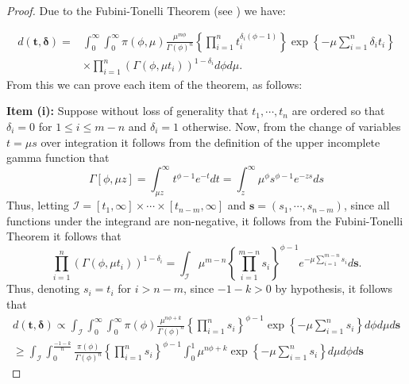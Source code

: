 \begin{proof} Due to the Fubini-Tonelli Theorem (see \cite{folland}) we have:

\begin{align*}%
d(\boldsymbol{t,\delta})=&\int_{0}^{\infty}\int_{0}^{\infty}\pi(\phi,\mu)\frac{\mu^{m\phi}}{\Gamma(\phi)^n}\left\{\prod_{i=1}^n{t_i^{\delta_i(\phi-1)}}\right\}\exp\left\{-\mu\sum_{i=1}^n {\delta_i}t_i\right\}\nonumber \\
&\times \prod_{i=1}^n\left(\Gamma(\phi,\mu t_i)\right)^{1-\delta_i}d\phi d\mu.
\end{align*}
From this we can prove each item of the theorem, as follows:

\vspace{0.3cm}
\noindent \textbf{Item (i):} Suppose without loss of generality that $t_1,\cdots,t_n$ are ordered so that $\delta_i=0$ for $1\leq i\leq m-n$ and $\delta_i=1$ otherwise. Now, from the change of variables $t=\mu s$ over integration it follows from the definition of the upper incomplete gamma function that
\begin{equation*}\Gamma[\phi,\mu z] =\int_{\mu z}^\infty t^{\phi-1} e^{-t}  dt =  \int_z^\infty \mu^\phi s^{\phi-1} e^{-zs} ds
\end{equation*}
Thus, letting $\mathcal{I}=[t_1,\infty]\times \cdots \times [t_{n-m},\infty]$ and $\boldsymbol{s} = (s_1,\cdots,s_{n-m})$, since all functions under the integrand are non-negative, it follows from the Fubini-Tonelli Theorem it follows that
\begin{equation*} \prod_{i=1}^n\left(\Gamma(\phi,\mu t_i)\right)^{1-\delta_i} = \int_{\mathcal{I}} \mu^{m-n} \left\{\prod_{i=1}^{m-n} s_i \right\}^{\phi-1}e^{-\mu \sum_{i=1}^{m-n} s_i}d\boldsymbol{s}.
\end{equation*}
Thus, denoting $s_i = t_i$ for $i>n-m$, since $-1-k>0$ by hypothesis, it follows that 
 \begin{equation}
 \begin{aligned}
 \label{posteriord2}
d(\boldsymbol{t,\delta})\propto \int_{\mathcal{I}} \int_{0}^{\infty}\int_{0}^{\infty}\pi(\phi)\frac{\mu^{n\phi+k}}{\Gamma(\phi)^n}\left\{\prod_{i=1}^n{s_i}\right\}^{\phi-1}\exp\left\{-\mu\sum_{i=1}^n s_i\right\}d\phi d\mu d\boldsymbol{s} \\
\geq \int_{\mathcal{I}} \int_{0}^{\frac{-1-k}{n}}\frac{\pi(\phi)}{\Gamma(\phi)^n}\left\{\prod_{i=1}^n{s_i}\right\}^{\phi-1}\int_{0}^{1}\mu^{n\phi+k}\exp\left\{-\mu\sum_{i=1}^n s_i\right\}d\mu d\phi d\boldsymbol{s}
\end{aligned}

\end{equation}
\end{proof}
